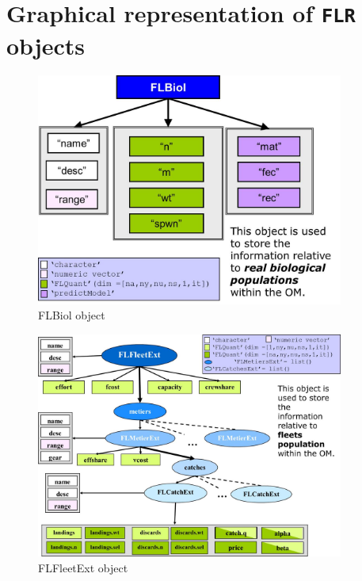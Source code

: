 

\section{Graphical representation of \texttt{FLR} objects} \label{sec:GraphObjs}

\setcounter{figure}{0} 
\setcounter{table}{0}


\begin{figure}[!h]
  \centering
    \includegraphics[width= 0.9\textwidth]{FLBiol}
   \caption{FLBiol object}
   \label{fig:FLBiol}
\end{figure}


\begin{figure}[!h]
  \centering
    \includegraphics[width= 0.9\textwidth]{FLFleetExt}
  \caption{FLFleetExt object}
  \label{fig:FLFleetExt}
\end{figure}

